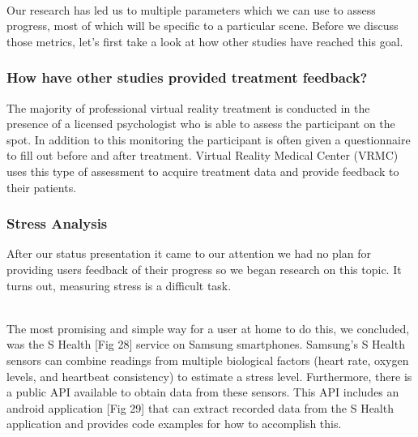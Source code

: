 \documentclass[a4paper,10pt]{article}
\begin{document}
\par~\\ 
Our research has led us to multiple parameters which we can use to assess progress, most of which will be specific to a particular scene. Before we discuss those metrics, let's first take a look at how other studies have reached this goal.

\subsubsection{How have other studies provided treatment feedback?}
The majority of professional virtual reality treatment is conducted in the presence of a licensed psychologist who is able to assess the participant on the spot. In addition to this monitoring the participant is often given a questionnaire to fill out before and after treatment. Virtual Reality Medical Center (VRMC) uses this type of assessment to acquire treatment data and provide feedback to their patients. \cite{vrPhobia}

\subsubsection{Stress Analysis}
After our status presentation it came to our attention we had no plan for providing users feedback of their progress so we began research on this topic. It turns out, measuring stress is a difficult task. 
\par~\\
The most promising and simple way for a user at home to do this, we concluded, was the S Health [Fig 28] service on Samsung smartphones. Samsung's S Health sensors can combine readings from multiple biological factors (heart rate, oxygen levels, and heartbeat consistency) to estimate a stress level. Furthermore, there is a public API available to obtain data from these sensors. This API includes an android application [Fig 29] that can extract recorded data from the S Health application and provides code examples for how to accomplish this. 
\end{document}
